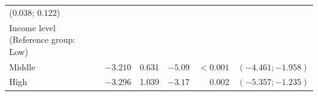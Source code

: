 \documentclass[11pt,a4paper,openany]{book}
\begin{document}
\begin{longtable}[]{@{}lrrrrc@{}}
\begin{minipage}[t]{0.10\columnwidth}
(0.038; 0.122)\strut
\end{minipage}\tabularnewline
\begin{minipage}[t]{0.44\columnwidth}\raggedright\strut
Income level (Reference group: Low)\strut
\end{minipage} & \begin{minipage}[t]{0.09\columnwidth}\raggedleft\strut
\strut
\end{minipage} & \begin{minipage}[t]{0.05\columnwidth}\raggedleft\strut
\strut
\end{minipage} & \begin{minipage}[t]{0.06\columnwidth}\raggedleft\strut
\strut
\end{minipage} & \begin{minipage}[t]{0.08\columnwidth}\raggedleft\strut
\strut
\end{minipage} & \begin{minipage}[t]{0.10\columnwidth}\centering\strut
\strut
\end{minipage}\tabularnewline
\begin{minipage}[t]{0.44\columnwidth}\raggedright\strut
Middle\strut
\end{minipage} & \begin{minipage}[t]{0.09\columnwidth}\raggedleft\strut
\(-3.210\)\strut
\end{minipage} & \begin{minipage}[t]{0.05\columnwidth}\raggedleft\strut
0.631\strut
\end{minipage} & \begin{minipage}[t]{0.06\columnwidth}\raggedleft\strut
\(-5.09\)\strut
\end{minipage} & \begin{minipage}[t]{0.08\columnwidth}\raggedleft\strut
\(<0.001\)\strut
\end{minipage} & \begin{minipage}[t]{0.10\columnwidth}\centering\strut
\((-4.461; -1.958)\)\strut
\end{minipage}\tabularnewline
\begin{minipage}[t]{0.44\columnwidth}\raggedright\strut
High\strut
\end{minipage} & \begin{minipage}[t]{0.09\columnwidth}\raggedleft\strut
\(-3.296\)\strut
\end{minipage} & \begin{minipage}[t]{0.05\columnwidth}\raggedleft\strut
1.039\strut
\end{minipage} & \begin{minipage}[t]{0.06\columnwidth}\raggedleft\strut
\(-3.17\)\strut
\end{minipage} & \begin{minipage}[t]{0.08\columnwidth}\raggedleft\strut
0.002\strut
\end{minipage} & \begin{minipage}[t]{0.10\columnwidth}\centering\strut
\((-5.357; -1.235)\)\strut
\end{minipage}\tabularnewline
\bottomrule
\end{longtable}
\end{document}
